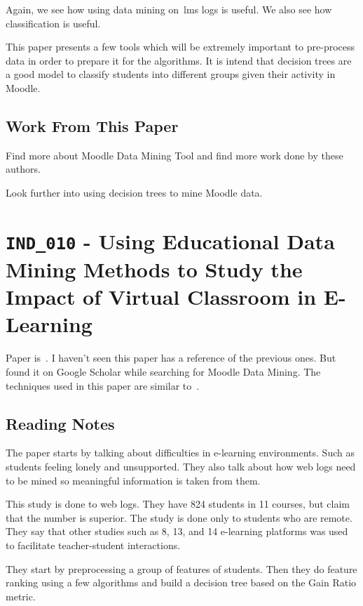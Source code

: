 Again, we see how using data mining on~\gls{lms} logs is useful. We also see
how classification is useful.

This paper presents a few tools which will be extremely important to
pre-process data in order to prepare it for the algorithms. It is intend that
decision trees are a good model to classify students into different groups
given their activity in Moodle.

\subsection{Work From This Paper}

Find more about Moodle Data Mining Tool and find more work done by these
authors.

Look further into using decision trees to mine Moodle data.

\section{\texttt{IND\_010} - Using Educational Data Mining Methods to Study the
Impact of Virtual Classroom in E-Learning}

Paper is~\cite{ind_010}. I haven't seen this paper has a reference of the
previous ones. But found it on Google Scholar while searching for Moodle Data
Mining. The techniques used in this paper are similar to~\cite{ind_008,
ind_003}.

\subsection{Reading Notes}

The paper starts by talking about difficulties in e-learning environments. Such
as students feeling lonely and unsupported. They also talk about how web logs
need to be mined so meaningful information is taken from them.

This study is done to web logs. They have 824 students in 11 courses, but claim
that the number is superior. The study is done only to students who are remote.
They say that other studies such as 8, 13, and 14 e-learning platforms was used
to facilitate teacher-student interactions.

They start by preprocessing a group of features of students. Then they do
feature ranking using a few algorithms and build a decision tree based on the
Gain Ratio metric.

